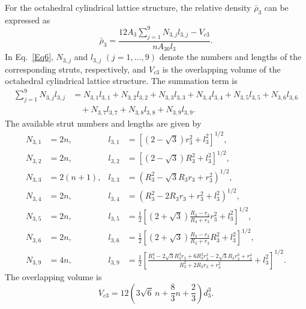 \documentclass[12pt,a4paper]{article}
\begin{document}
For the octahedral cylindrical lattice structure, the relative density $\bar{\rho}_3$ can be expressed as
%
\begin{equation}
	\bar{\rho}_3 =
	\frac{
		12A_3\sum_{j=1}^{9}N_{3,j}l_{3,j}
		-V_{c3}
	}{
		nA_{30}l_3
	}.
	\label{Eq6}
\end{equation}
%
In Eq.~\eqref{Eq6}, $N_{3,j}$ and $l_{3,j}$ $(j=1,\ldots,9)$ denote the numbers and lengths of the corresponding struts, respectively, and $V_{c3}$ is the overlapping volume of the octahedral cylindrical lattice structure. The summation term is
%
\[
\begin{aligned}
	\sum_{j=1}^{9}N_{3,j}l_{3,j}
	&=
	N_{3,1}l_{3,1}
	+N_{3,2}l_{3,2}
	+N_{3,3}l_{3,3}
	+N_{3,4}l_{3,4}
	+N_{3,5}l_{3,5}
	+N_{3,6}l_{3,6} \\
	&\quad
	+N_{3,7}l_{3,7}
	+N_{3,8}l_{3,8}
	+N_{3,9}l_{3,9}.
\end{aligned}
\]
%
The available strut numbers and lengths are given by
%
\[
\begin{aligned}
	N_{3,1} &= 2n, &
	l_{3,1} &=
	\left[
	\left(2-\sqrt{3}\right)r_3^2+l_3^2
	\right]^{1/2}, \\[0.5em]
	N_{3,2} &= 2n, &
	l_{3,2} &=
	\left[
	\left(2-\sqrt{3}\right)R_3^2+l_3^2
	\right]^{1/2}, \\[0.5em]
	N_{3,3} &= 2(n+1), &
	l_{3,3} &=
	\left(
	R_3^2-\sqrt{3}R_3r_3+r_3^2
	\right)^{1/2}, \\[0.5em]
	N_{3,4} &= 2n, &
	l_{3,4} &=
	\left(
	R_3^2-2R_3r_3+r_3^2+l_3^2
	\right)^{1/2}, \\[0.5em]
	N_{3,5} &= 2n, &
	l_{3,5} &=
	\frac{1}{2}
	\left[
	\left(2+\sqrt{3}\right)
	\frac{R_3-r_3}{R_3+r_3}r_3^2
	+l_3^2
	\right]^{1/2}, \\[0.5em]
	N_{3,6} &= 2n, &
	l_{3,6} &=
	\frac{1}{2}
	\left[
	\left(2+\sqrt{3}\right)
	\frac{R_3-r_3}{R_3+r_3}R_3^2
	+l_3^2
	\right]^{1/2}, \\[0.5em]
	N_{3,9} &= 4n, &
	l_{3,9} &=
	\frac{1}{2}
	\left[
	\frac{
		R_3^4
		-2\sqrt{3}R_3^3r_3
		+6R_3^2r_3^2
		-2\sqrt{3}R_3r_3^3
		+r_3^4
	}{
		R_3^2+2R_3r_3+r_3^2
	}
	+l_3^2
	\right]^{1/2}.
\end{aligned}
\]
%
The overlapping volume is
%
\[
V_{c3} =
12\left(3\sqrt{6}\,n+\frac{8}{3}n+\frac{2}{3}\right)d_3^3.
\]
%
\end{document}

